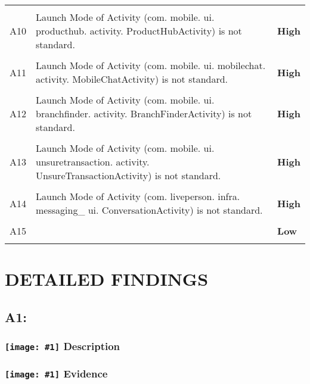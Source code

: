 \documentclass[12p]{article}
\newcommand{\icon}[1]{\texttt{[image: \#1]}}
\begin{document}
\begin{longtable}{p{0.5cm} p{10cm} p{1.5cm}}
\hline\\	A10&Launch Mode of Activity \newline (com. mobile. ui. producthub. activity. ProductHubActivity) is not standard.& \color{ferrarired}\textbf{High} \\
\hline\\	A11&Launch Mode of Activity \newline (com. mobile. ui. mobilechat. activity. MobileChatActivity) is not standard.& \color{ferrarired}\textbf{High} \\
\hline\\	A12&Launch Mode of Activity \newline (com. mobile. ui. branchfinder. activity. BranchFinderActivity) is not standard.& \color{ferrarired}\textbf{High} \\
\hline\\	A13&Launch Mode of Activity \newline (com. mobile. ui. unsuretransaction. activity. UnsureTransactionActivity) is not standard.& \color{ferrarired}\textbf{High} \\
\hline\\	A14&Launch Mode of Activity \newline (com. liveperson. infra. messaging\_ ui. ConversationActivity) is not standard.& \color{ferrarired}\textbf{High} \\
\hline\\	A15&& \color{amber}\textbf{Low} \\
\hline\\	\end{longtable}
\cleardoublepage
\newpage
\section{DETAILED FINDINGS}
\subsection{A1: }
\subsubsection*{\protect\icon{/home/miki/Documents/GITHUB/AndroidPermissions/python/vulns/report_icons/basic_sheet.png} Description}

\subsubsection*{\protect\icon{/home/miki/Documents/GITHUB/AndroidPermissions/python/vulns/report_icons/basic_magnifier.png} Evidence}
\end{document}
